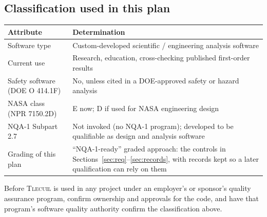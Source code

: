 \documentclass[11pt]{article}
\newcommand{\tlecuil}{\textsc{Tlecuil}}
\begin{document}
\subsection{Classification used in this plan}
\begin{center}
\begin{tabularx}{\textwidth}{lL}
\toprule
Attribute & Determination \\
\midrule
Software type & Custom-developed scientific / engineering analysis software \\
Current use & Research, education, cross-checking published first-order results \\
Safety software (DOE O 414.1F) & No, unless cited in a DOE-approved safety or hazard analysis \\
NASA class (NPR 7150.2D) & E now; D if used for NASA engineering design \\
NQA-1 Subpart 2.7 & Not invoked (no NQA-1 program); developed to be qualifiable as design and analysis software \\
Grading of this plan & ``NQA-1-ready'' graded approach: the controls in Sections~\ref{sec:req}--\ref{sec:records}, with records kept so a later qualification can rely on them \\
\bottomrule
\end{tabularx}
\end{center}

\begin{decision}
Before \tlecuil{} is used in any project under an employer's or sponsor's quality assurance
program, confirm ownership and approvals for the code, and have that program's software
quality authority confirm the classification above.
\end{decision}

\end{document}

